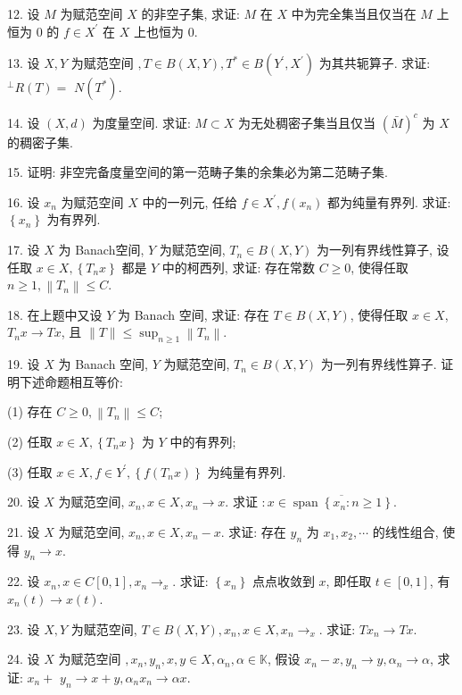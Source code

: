 \documentclass[openany]{ctexbook}
\theoremstyle{kaiti}
\theoremstyle{normal}
\begin{document}
12. 设 $M$ 为赋范空间 $X$ 的非空子集, 求证: $M$ 在 $X$ 中为完全集当且仅当在 $M$ 上恒为 0 的 $f \in X^{\prime}$ 在 $X$ 上也恒为 0.

13. 设 $X, Y$ 为赋范空间 $, T \in B(X, Y), T^{*} \in B\left(Y^{\prime}, X^{\prime}\right)$ 为其共轭算子. 求证: ${ }^{\perp} R(T)=$ $N\left(T^{*}\right)$.

14. 设 $(X, d)$ 为度量空间. 求证: $M \subset X$ 为无处稠密子集当且仅当 $(\bar{M})^{c}$ 为 $X$ 的稠密子集.

15. 证明: 非空完备度量空间的第一范畴子集的余集必为第二范畴子集.

16. 设 $x_n$ 为赋范空间 $X$ 中的一列元, 任给 $f \in X^{\prime}, f\left(x_n\right)$ 都为纯量有界列. 求证: $\left\{x_n\right\}$ 为有界列.

17. 设 $X$ 为 Banach空间, $Y$ 为赋范空间, $T_n \in B(X, Y)$ 为一列有界线性算子, 设任取 $x \in X,\left\{T_n x\right\}$ 都是 $Y$ 中的柯西列, 求证: 存在常数 $C \geqslant 0$, 使得任取 $n \geqslant 1,\left\|T_n\right\| \leqslant C$.

18. 在上题中又设 $Y$ 为 Banach 空间, 求证: 存在 $T \in B(X, Y)$, 使得任取 $x \in X$, $T_n x \rightarrow T x$, 且 $\|T\| \leqslant \sup_{n \geqslant 1}\left\|T_n\right\|$.

19. 设 $X$ 为 Banach 空间, $Y$ 为赋范空间, $T_n \in B(X, Y)$ 为一列有界线性算子. 证明下述命题相互等价:

(1) 存在 $C \geqslant 0,\left\|T_n\right\| \leqslant C$;

(2) 任取 $x \in X,\left\{T_n x\right\}$ 为 $Y$ 中的有界列;

(3) 任取 $x \in X, f \in Y^{\prime},\left\{f\left(T_n x\right)\right\}$ 为纯量有界列.

20. 设 $X$ 为赋范空间, $x_n, x \in X, x_n \rightarrow x$. 求证 $: x \in \overline{\operatorname{span}\left\{x_n: n \geqslant 1\right\}}$.

21. 设 $X$ 为赋范空间, $x_n, x \in X, x_n-x$. 求证: 存在 $y_n$ 为 $x_1, x_2, \cdots$ 的线性组合, 使得 $y_n \rightarrow x$.

22. 设 $x_n, x \in C[0,1], x_n \rightarrow_{x}$. 求证: $\left\{x_n\right\}$ 点点收敛到 $x$, 即任取 $t \in[0,1]$, 有 $x_n(t) \rightarrow x(t)$.

23. 设 $X, Y$ 为赋范空间, $T \in B(X, Y), x_n, x \in X, x_n \rightarrow_{x}$. 求证: $T x_n \rightarrow T x$.

24. 设 $X$ 为赋范空间 $, x_n, y_n, x, y \in X, \alpha_n, \alpha \in \mathbb{K}$, 假设 $x_n-x, y_n \rightarrow y, \alpha_n \rightarrow \alpha$, 求证: $x_n+$ $y_n \rightarrow x+y, \alpha_n x_n \rightarrow \alpha x.$
\end{document}
